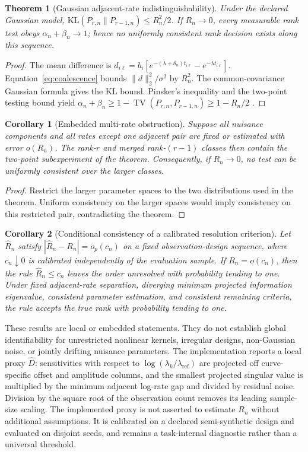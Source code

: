 \documentclass[11pt]{article}
\newtheorem{theorem}{Theorem}
\newtheorem{corollary}{Corollary}
\begin{document}
\begin{theorem}[Gaussian adjacent-rate indistinguishability]
Under the declared Gaussian model, $\mathrm{KL}(P_{r,n}\|P_{r-1,n})\le R_n^2/2$. If $R_n\to0$, every measurable rank test obeys $\alpha_n+\beta_n\to1$; hence no uniformly consistent rank decision exists along this sequence.
\end{theorem}
\begin{proof}
The mean difference is $d_{i\ell}=b_i[e^{-(\lambda+\delta_n)t_{i\ell}}-e^{-\lambda t_{i\ell}}]$. Equation~\eqref{eq:coalescence} bounds $\|d\|_2^2/\sigma^2$ by $R_n^2$. The common-covariance Gaussian formula gives the KL bound. Pinsker's inequality and the two-point testing bound yield $\alpha_n+\beta_n\ge1-\operatorname{TV}(P_{r,n},P_{r-1,n})\ge1-R_n/2$ \cite{tsybakov2009nonparametric}.
\end{proof}

\begin{corollary}[Embedded multi-rate obstruction]
Suppose all nuisance components and all rates except one adjacent pair are fixed or estimated with error $o(R_n)$. The rank-$r$ and merged rank-$(r-1)$ classes then contain the two-point subexperiment of the theorem. Consequently, if $R_n\to0$, no test can be uniformly consistent over the larger classes.
\end{corollary}
\begin{proof}
Restrict the larger parameter spaces to the two distributions used in the theorem. Uniform consistency on the larger spaces would imply consistency on this restricted pair, contradicting the theorem.
\end{proof}
\begin{corollary}[Conditional consistency of a calibrated resolution criterion]
Let $\widehat R_n$ satisfy $|\widehat R_n-R_n|=o_p(c_n)$ on a fixed observation-design sequence, where $c_n\downarrow0$ is calibrated independently of the evaluation sample. If $R_n=o(c_n)$, then the rule $\widehat R_n\le c_n$ leaves the order unresolved with probability tending to one. Under fixed adjacent-rate separation, diverging minimum projected information eigenvalue, consistent parameter estimation, and consistent remaining criteria, the rule accepts the true rank with probability tending to one.
\end{corollary}

These results are local or embedded statements. They do not establish global identifiability for unrestricted nonlinear kernels, irregular designs, non-Gaussian noise, or jointly drifting nuisance parameters. The implementation reports a local proxy $\widehat D$: sensitivities with respect to $\log(\lambda_k/\lambda_{\mathrm{ref}})$ are projected off curve-specific offset and amplitude columns, and the smallest projected singular value is multiplied by the minimum adjacent log-rate gap and divided by residual noise. Division by the square root of the observation count removes its leading sample-size scaling. The implemented proxy is not asserted to estimate $R_n$ without additional assumptions. It is calibrated on a declared semi-synthetic design and evaluated on disjoint seeds, and remains a task-internal diagnostic rather than a universal threshold.
\end{document}
